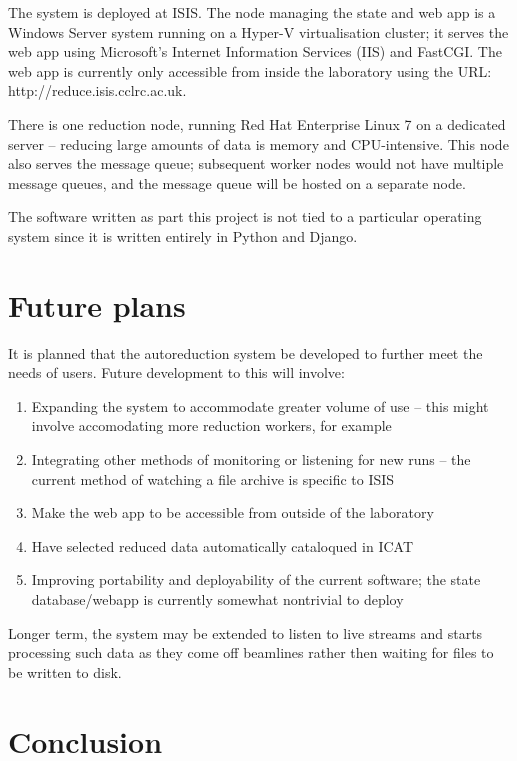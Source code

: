 \documentclass[twocolumn]{article}
\begin{document}
The system is deployed at ISIS. The node managing
the state and web app is a Windows Server system running on a 
Hyper-V\cite{hyper-v} virtualisation cluster; it serves the web app using
Microsoft's Internet Information Services (IIS)\cite{iis} and 
FastCGI\cite{fcgi}. The web app is currently only accessible from inside
the laboratory using the URL: http://reduce.isis.cclrc.ac.uk. 

There is one reduction node, running Red Hat Enterprise Linux 7\cite{rhel}
on a dedicated server -- reducing large amounts of data is memory and CPU-intensive.
This node also serves the message queue; subsequent worker nodes would
not have multiple message queues, and the message queue will be hosted
on a separate node.

The software written as part this project is not tied to a
particular operating system since it is written entirely in Python and Django. 

\section{Future plans}\label{future-plans}

It is planned that the autoreduction system be developed to further meet
the needs of users. Future development to this will involve:

\begin{enumerate}
\item
  Expanding the system to accommodate greater volume of use -- this
  might involve accomodating more reduction workers, for example
\item
  Integrating other methods of monitoring or listening for new runs -- the current
  method of watching a file archive is specific to ISIS
\item
  Make the web app to be accessible from outside of the laboratory
\item
  Have selected reduced data automatically cataloqued in ICAT 
\item
  Improving portability and deployability of the current software; the
  state database/webapp is currently somewhat nontrivial to deploy
\end{enumerate}

Longer term, the system may be extended to listen to live streams and starts
processing such data as they come off beamlines rather then waiting for files 
to be written to disk. 

\section{Conclusion}\label{conclusion}
\end{document}
